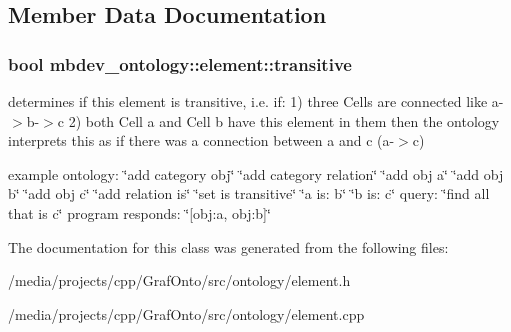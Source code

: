 \subsection{\-Member \-Data \-Documentation}
\hypertarget{classmbdev__ontology_1_1element_a2dd58a46bab19cdf0c243bcd84c23fdb}{
\subsubsection[{transitive}]{\setlength{\rightskip}{0pt plus 5cm}bool {\bf mbdev\-\_\-ontology\-::element\-::transitive}}}\label{classmbdev__ontology_1_1element_a2dd58a46bab19cdf0c243bcd84c23fdb}


determines if this element is transitive, i.\-e. if\-: 1) three \-Cells are connected like a-\/$>$b-\/$>$c 2) both \-Cell a and \-Cell b have this element in them then the ontology interprets this as if there was a connection between a and c (a-\/$>$c) 

example ontology\-: \char`\"{}add category obj\char`\"{} \char`\"{}add category relation\char`\"{} \char`\"{}add obj a\char`\"{} \char`\"{}add obj b\char`\"{} \char`\"{}add obj c\char`\"{} \char`\"{}add relation is\char`\"{} \char`\"{}set is transitive\char`\"{} \char`\"{}a is\-: b\char`\"{} \char`\"{}b is\-: c\char`\"{} query\-: \char`\"{}find all that is c\char`\"{} program responds\-: \char`\"{}\mbox{[}obj\-:a, obj\-:b\mbox{]}\char`\"{} 

\-The documentation for this class was generated from the following files\-:\begin{DoxyCompactItemize}
\item 
/media/projects/cpp/\-Graf\-Onto/src/ontology/element.\-h\item 
/media/projects/cpp/\-Graf\-Onto/src/ontology/element.\-cpp\end{DoxyCompactItemize}
